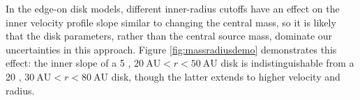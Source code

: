 \documentclass[twocolumn]{aastex62}
\newcommand{\sourcei}{SrcI\xspace}
\begin{document}




In the edge-on disk models, different inner-radius cutoffs have an effect on
the inner velocity profile slope similar to changing the central mass, so it is
likely that the disk parameters, rather than the central source mass, dominate
our uncertainties in this approach.  
Figure \ref{fig:massradiusdemo} demonstrates this effect: the inner slope of
a 5 \msun, $20~\mathrm{AU} < r < 50~\mathrm{AU}$ disk is indistinguishable
from a 20 \msun , $30~\mathrm{AU} < r < 80~\mathrm{AU}$ disk, though the latter
extends to higher velocity and radius.

\end{document}
